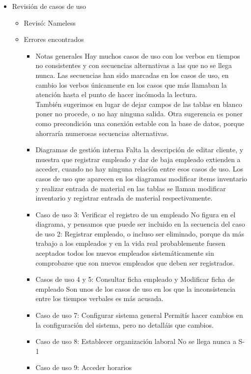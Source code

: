 \documentclass[11pt, a4paper, twoside, titlepage]{article}
\begin{document}
		\begin{itemize}
			\item Revisión de casos de uso
				\begin{itemize}
					\item Revisó: Nameless
					\item Errores encontrados
						\begin{itemize}
							\item Notas generales 
								Hay muchos casos de uso con los verbos en tiempos no consistentes y con secuencias alternativas a las que no se llega nunca. Las secuencias han sido marcadas en los casos de uso, en cambio los verbos únicamente en los casos que más llamaban la atención hasta el punto de hacer incómoda la lectura. \\
								También sugerimos en lugar de dejar campos de las tablas en blanco poner no procede, o no hay ninguna salida. Otra sugerencia es poner como precondición una conexión estable con la base de datos, porque ahorraría numerosas secuencias alternativas.
							\item Diagramas de gestión interna 
								Falta la descripción de editar cliente, y muestra que registrar empleado y dar de baja empleado extienden a acceder, cuando no hay ninguna relación entre esos casos de uso. Los casos de uso que aparecen en los diagramas modificar items inventario y realizar entrada de material en las tablas se llaman modificar inventario y registrar entrada de material respectivamente.
							\item Caso de uso 3: Verificar el registro de un empleado 
								No figura en el diagrama, y pensamos que puede ser incluido en la secuencia del caso de uso 2: Registrar empleado, o incluso ser eliminado, porque da más trabajo a los empleados y en la vida real probablemente fuesen aceptados todos los nuevos empleados sistemáticamente sin comprobarse que son nuevos empleados que deben ser registrados.
							\item Casos de uso 4 y 5: Consultar ficha empleado y Modificar ficha de empleado 
								Son unos de los casos de uso en los que la inconsistencia entre los tiempos verbales es más acusada.
							\item Caso de uso 7: Configurar sistema general 
								Permitís hacer cambios en la configuración del sistema, pero no detalláis que cambios.
							\item Caso de uso 8: Establecer organización laboral 
								No se llega nunca a S-1
							\item Caso de uso 9: Acceder horarios 

\end{itemize}
\end{itemize}
\end{itemize}
\end{document}
